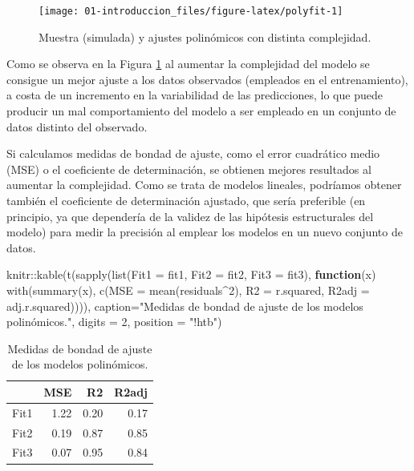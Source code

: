 \documentclass[
]{book}
\newenvironment{Shaded}{\begin{snugshade}}{\end{snugshade}}
\newcommand{\AttributeTok}[1]{\textcolor[rgb]{0.77,0.63,0.00}{#1}}
\newcommand{\ControlFlowTok}[1]{\textcolor[rgb]{0.13,0.29,0.53}{\textbf{#1}}}
\newcommand{\DecValTok}[1]{\textcolor[rgb]{0.00,0.00,0.81}{#1}}
\newcommand{\FunctionTok}[1]{\textcolor[rgb]{0.00,0.00,0.00}{#1}}
\newcommand{\NormalTok}[1]{#1}
\newcommand{\SpecialCharTok}[1]{\textcolor[rgb]{0.00,0.00,0.00}{#1}}
\newcommand{\StringTok}[1]{\textcolor[rgb]{0.31,0.60,0.02}{#1}}
\theoremstyle{break}
\theoremstyle{definition}
\theoremstyle{definition}
\theoremstyle{definition}
\theoremstyle{definition}
\theoremstyle{remark}
\begin{document}
\begin{figure}[!htb]

{\centering \texttt{[image: 01-introduccion\_files/figure-latex/polyfit-1]} 

}

\caption{Muestra (simulada) y ajustes polinómicos con distinta complejidad.}\label{fig:polyfit}
\end{figure}

Como se observa en la Figura \ref{fig:polyfit} al aumentar la complejidad del modelo se consigue un mejor ajuste a los datos observados (empleados en el entrenamiento), a costa de un incremento en la variabilidad de las predicciones, lo que puede producir un mal comportamiento del modelo a ser empleado en un conjunto de datos distinto del observado.

Si calculamos medidas de bondad de ajuste, como el error cuadrático medio (MSE) o el coeficiente de determinación, se obtienen mejores resultados al aumentar la complejidad.
Como se trata de modelos lineales, podríamos obtener también el coeficiente de determinación ajustado, que sería preferible (en principio, ya que dependería de la validez de las hipótesis estructurales del modelo) para medir la precisión al emplear los modelos en un nuevo conjunto de datos.

\begin{Shaded}
\begin{Highlighting}[]
\NormalTok{knitr}\SpecialCharTok{::}\FunctionTok{kable}\NormalTok{(}\FunctionTok{t}\NormalTok{(}\FunctionTok{sapply}\NormalTok{(}\FunctionTok{list}\NormalTok{(}\AttributeTok{Fit1 =}\NormalTok{ fit1, }\AttributeTok{Fit2 =}\NormalTok{ fit2, }\AttributeTok{Fit3 =}\NormalTok{ fit3), }
    \ControlFlowTok{function}\NormalTok{(x) }\FunctionTok{with}\NormalTok{(}\FunctionTok{summary}\NormalTok{(x), }
        \FunctionTok{c}\NormalTok{(}\AttributeTok{MSE =} \FunctionTok{mean}\NormalTok{(residuals}\SpecialCharTok{\^{}}\DecValTok{2}\NormalTok{), }\AttributeTok{R2 =}\NormalTok{ r.squared, }\AttributeTok{R2adj =}\NormalTok{ adj.r.squared)))), }
    \AttributeTok{caption=}\StringTok{"Medidas de bondad de ajuste de los modelos polinómicos."}\NormalTok{, }\AttributeTok{digits =} \DecValTok{2}\NormalTok{, }\AttributeTok{position =} \StringTok{"!htb"}\NormalTok{)}
\end{Highlighting}
\end{Shaded}

\begin{table}[!htb]

\caption{\label{tab:unnamed-chunk-2}Medidas de bondad de ajuste de los modelos polinómicos.}
\centering
\begin{tabular}[t]{l|r|r|r}
\hline
  & MSE & R2 & R2adj\\
\hline
Fit1 & 1.22 & 0.20 & 0.17\\
\hline
Fit2 & 0.19 & 0.87 & 0.85\\
\hline
Fit3 & 0.07 & 0.95 & 0.84\\
\hline
\end{tabular}
\end{table}
\end{document}
